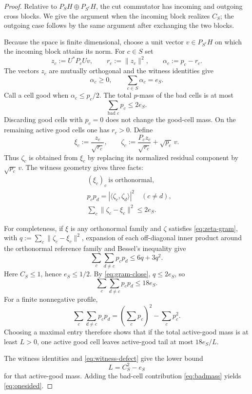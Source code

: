 \documentclass[11pt]{article}
\begin{document}
\begin{proof}
Relative to $P_SH\oplus P_{S^c}H$, the cut commutator has incoming and
outgoing cross blocks.  We give the argument when the incoming block realizes
$C_S$; the outgoing case follows by the same argument after exchanging the
two blocks.

Because the space is finite dimensional, choose a unit vector
$v\in P_{S^c}H$ on which the incoming block attains its norm.  For $c\in S$
set
\[
  z_c:=U^*P_cUv,\qquad
  r_c:=\|z_c\|^2,\qquad
  \alpha_c:=p_c-r_c.
\]
The vectors $z_c$ are mutually orthogonal and the witness identities give
\begin{equation}\label{eq:witness-defect}
  \alpha_c\ge0,\qquad
  \sum_{c\in S}\alpha_c=e_S.
\end{equation}
Call a cell good when $\alpha_c\le p_c/2$.  The total $p$-mass of the bad
cells is at most
\begin{equation}\label{eq:badmass}
  \sum_{\text{bad }c}p_c\le2e_S.
\end{equation}
Discarding good cells with $p_c=0$ does not change the good-cell mass.  On
the remaining active good cells one has $r_c>0$.  Define
\[
  \xi_c:=\frac{z_c}{\sqrt{r_c}},
  \qquad
  \zeta_c:=
    \frac{P_c z_c}{\sqrt{r_c}}+\sqrt{p_c}\,v.
\]
Thus $\zeta_c$ is obtained from $\xi_c$ by replacing its normalized residual
component by $\sqrt{p_c}\,v$.  The witness geometry gives three facts:
\begin{align}
  &(\xi_c)_c\ \text{is orthonormal}, \label{eq:xi-orth}\\
  &p_cp_d=|\langle\zeta_c,\zeta_d\rangle|^2
      \quad(c\ne d), \label{eq:zeta-gram}\\
  &\sum_c\|\zeta_c-\xi_c\|^2\le2e_S. \label{eq:gram-close}
\end{align}

For completeness, if $\xi$ is any orthonormal family and $\zeta$ satisfies
\eqref{eq:zeta-gram}, with
$q:=\sum_c\|\zeta_c-\xi_c\|^2$, expansion of each off-diagonal inner product
around the orthonormal reference family and Bessel's inequality give
\begin{equation}\label{eq:gram-spread-general}
  \sum_c\sum_{d\ne c}p_cp_d
  \le 6q+3q^2.
\end{equation}
Here $C_S\le1$, hence $e_S\le1/2$.  By \eqref{eq:gram-close},
$q\le2e_S$, so
\begin{equation}\label{eq:gram18}
  \sum_c\sum_{d\ne c}p_cp_d\le18e_S.
\end{equation}
For a finite nonnegative profile,
\[
  \sum_c\sum_{d\ne c}p_cp_d
  =
  \left(\sum_cp_c\right)^2-\sum_cp_c^2.
\]
Choosing a maximal entry therefore shows that if the total active-good mass
is at least $L>0$, one active good cell leaves active-good tail at most
$18e_S/L$.

The witness identities and \eqref{eq:witness-defect} give the lower bound
\[
  L=C_S^2-e_S
\]
for that active-good mass.  Adding the bad-cell contribution
\eqref{eq:badmass} yields \eqref{eq:onesided}.
\end{proof}
\end{document}
